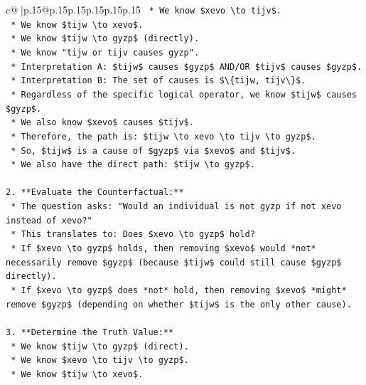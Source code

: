 \documentclass{article}
\begin{document}
{\begin{supertabular}{c@{$\;$}|p{.15\linewidth}@{}p{.15\linewidth}p{.15\linewidth}p{.15\linewidth}p{.15\linewidth}p{.15\linewidth}}
{{{\texttt{    *   We know \$xevo \textbackslash{}to tijv\$.} \\
\texttt{    *   We know \$tijw \textbackslash{}to xevo\$.} \\
\texttt{    *   We know \$tijw \textbackslash{}to gyzp\$ (directly).} \\
\texttt{    *   We know "tijw or tijv causes gyzp".} \\
\texttt{        *   Interpretation A: \$tijw\$ causes \$gyzp\$ AND/OR \$tijv\$ causes \$gyzp\$.} \\
\texttt{        *   Interpretation B: The set of causes is \$\textbackslash{}\{tijw, tijv\textbackslash{}\}\$.} \\
\texttt{    *   Regardless of the specific logical operator, we know \$tijw\$ causes \$gyzp\$.} \\
\texttt{    *   We also know \$xevo\$ causes \$tijv\$.} \\
\texttt{    *   Therefore, the path is: \$tijw \textbackslash{}to xevo \textbackslash{}to tijv \textbackslash{}to gyzp\$.} \\
\texttt{    *   So, \$tijw\$ is a cause of \$gyzp\$ via \$xevo\$ and \$tijv\$.} \\
\texttt{    *   We also have the direct path: \$tijw \textbackslash{}to gyzp\$.} \\
\\ 
\texttt{2.  **Evaluate the Counterfactual:**} \\
\texttt{    *   The question asks: "Would an individual is not gyzp if not xevo instead of xevo?"} \\
\texttt{    *   This translates to: Does \$xevo \textbackslash{}to gyzp\$ hold?} \\
\texttt{    *   If \$xevo \textbackslash{}to gyzp\$ holds, then removing \$xevo\$ would *not* necessarily remove \$gyzp\$ (because \$tijw\$ could still cause \$gyzp\$ directly).} \\
\texttt{    *   If \$xevo \textbackslash{}to gyzp\$ does *not* hold, then removing \$xevo\$ *might* remove \$gyzp\$ (depending on whether \$tijw\$ is the only other cause).} \\
\\ 
\texttt{3.  **Determine the Truth Value:**} \\
\texttt{    *   We know \$tijw \textbackslash{}to gyzp\$ (direct).} \\
\texttt{    *   We know \$xevo \textbackslash{}to tijv \textbackslash{}to gyzp\$.} \\
\texttt{    *   We know \$tijw \textbackslash{}to xevo\$.} \\
}}}
\end{supertabular}}
\end{document}

